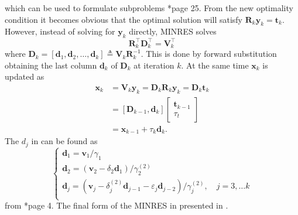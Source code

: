 which can be used to formulate subproblems \cite{ChoiSou-ChengTerrya2007Imfs}*{page 25}. From the new optimality condition it becomes obvious that the optimal solution will satisfy $\bm{R}_k \bm{y}_k = \bm{t}_k$. However, instead of solving for $\bm{y}_k$ directly, MINRES solves
\begin{equation}\label{eq: MINRES_xk_recurr_1}
    \bm{R}_{k}^{\intercal} \bm{D}_{k}^{\intercal} = \bm{V}_{k}^{\intercal}
\end{equation}
where $\bm{D}_{k} =
    \left[ \bm{d}_1 , \bm{d}_2 , \ldots , \bm{d}_k \right] \triangleq \bm{V}_k \bm{R}_k^{-1}$. This is done by forward substitution obtaining the last column $\bm{d}_k$ of $\bm{D}_k$ at iteration $k$. At the same time $\bm{x}_k$ is updated as
\begin{align} \label{eq: MINRES_xk_recurr_2}
    \bm{x}_k & = \bm{V}_k \bm{y}_k = \bm{D}_k \bm{R}_k \bm{y}_k = \bm{D}_k \bm{t}_k \nonumber \\
             & = \left[ \bm{D}_{k-1} , \bm{d}_k \right]
    \begin{bmatrix}
        \bm{t}_{k-1} \\ \tau_{t}
    \end{bmatrix} \nonumber                                                      \\
             & = \bm{x}_{k-1} + \tau_{k} \bm{d}_{k}.
\end{align}
The $d_j$ in  can be found as
\begin{equation*}
    \left\{
    \begin{array}{l}
        \bm{d}_1 = \bm{v}_1 / \gamma_1                                                                                                        \\
        \bm{d}_2 = \left( \bm{v}_2 - \delta_2 \bm{d}_1 \right) / \gamma_{2}^{(2)}                                                             \\
        \bm{d}_j = \left( \bm{v}_j - \delta_j^{(2)} \bm{d}_{j-1} -\varepsilon_{j} \bm{d}_{j-2} \right) / \gamma_{j}^{(2)}, \quad j=3,\ldots k \\
    \end{array}
    \right.
\end{equation*}
from   \cite{CHOISou-ChengT2011MAKS}*{page 4}. The final form of the MINRES in presented in .

